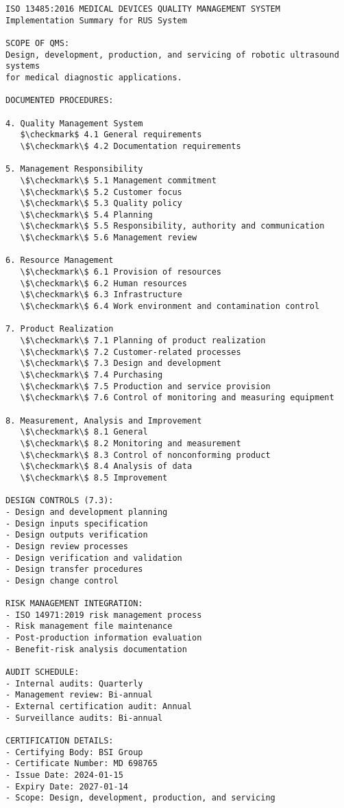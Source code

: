 \begin{lstlisting}[basicstyle=\ttfamily\footnotesize, caption={ISO 13485 QMS Implementation}, label={lst:app-iso13485}]
ISO 13485:2016 MEDICAL DEVICES QUALITY MANAGEMENT SYSTEM
Implementation Summary for RUS System

SCOPE OF QMS:
Design, development, production, and servicing of robotic ultrasound systems
for medical diagnostic applications.

DOCUMENTED PROCEDURES:

4. Quality Management System
   $\checkmark$ 4.1 General requirements
   \$\checkmark\$ 4.2 Documentation requirements
   
5. Management Responsibility
   \$\checkmark\$ 5.1 Management commitment
   \$\checkmark\$ 5.2 Customer focus
   \$\checkmark\$ 5.3 Quality policy
   \$\checkmark\$ 5.4 Planning
   \$\checkmark\$ 5.5 Responsibility, authority and communication
   \$\checkmark\$ 5.6 Management review

6. Resource Management
   \$\checkmark\$ 6.1 Provision of resources
   \$\checkmark\$ 6.2 Human resources
   \$\checkmark\$ 6.3 Infrastructure
   \$\checkmark\$ 6.4 Work environment and contamination control

7. Product Realization
   \$\checkmark\$ 7.1 Planning of product realization
   \$\checkmark\$ 7.2 Customer-related processes
   \$\checkmark\$ 7.3 Design and development
   \$\checkmark\$ 7.4 Purchasing
   \$\checkmark\$ 7.5 Production and service provision
   \$\checkmark\$ 7.6 Control of monitoring and measuring equipment

8. Measurement, Analysis and Improvement
   \$\checkmark\$ 8.1 General
   \$\checkmark\$ 8.2 Monitoring and measurement
   \$\checkmark\$ 8.3 Control of nonconforming product
   \$\checkmark\$ 8.4 Analysis of data
   \$\checkmark\$ 8.5 Improvement

DESIGN CONTROLS (7.3):
- Design and development planning
- Design inputs specification
- Design outputs verification
- Design review processes
- Design verification and validation
- Design transfer procedures
- Design change control

RISK MANAGEMENT INTEGRATION:
- ISO 14971:2019 risk management process
- Risk management file maintenance
- Post-production information evaluation
- Benefit-risk analysis documentation

AUDIT SCHEDULE:
- Internal audits: Quarterly
- Management review: Bi-annual
- External certification audit: Annual
- Surveillance audits: Bi-annual

CERTIFICATION DETAILS:
- Certifying Body: BSI Group
- Certificate Number: MD 698765
- Issue Date: 2024-01-15
- Expiry Date: 2027-01-14
- Scope: Design, development, production, and servicing
\end{lstlisting}


